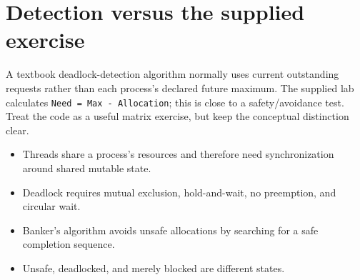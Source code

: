 \section{Detection versus the supplied exercise}
A textbook deadlock-detection algorithm normally uses current outstanding requests rather than each process's declared future maximum. The supplied lab calculates \texttt{Need = Max - Allocation}; this is close to a safety/avoidance test. Treat the code as a useful matrix exercise, but keep the conceptual distinction clear.





\begin{chapterrecap}
\begin{itemize}
  \item Threads share a process's resources and therefore need synchronization around shared mutable state.
  \item Deadlock requires mutual exclusion, hold-and-wait, no preemption, and circular wait.
  \item Banker's algorithm avoids unsafe allocations by searching for a safe completion sequence.
  \item Unsafe, deadlocked, and merely blocked are different states.
\end{itemize}
\end{chapterrecap}
